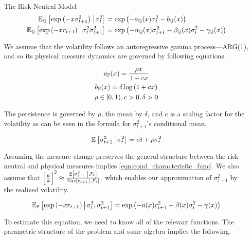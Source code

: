 \documentclass[11pt, letterpaper, twoside, final]{article}
\begin{document}
\begin{defn}{The Risk-Neutral Model}
\begin{align}
    \mathbb{E}_{\mathbb{Q}}\left[\exp\left(-x  \sigma^2_{t+1}\right) \,\middle\vert\, \sigma^2_t\right] &= \exp\left(-a_{\mathbb{Q}}(x)
    \sigma_t^2 - b_{\mathbb{Q}}(x)\right) \\
    \mathbb{E}_{\mathbb{Q}}\left[\exp\left(-x  r_{t+1} \right)\,\middle\vert\, \sigma^2_t \sigma^2_{t+1}\right] &=
    \exp\left(-\alpha_{\mathbb{Q}}(x) \sigma^2_{t+1} - \beta_{\mathbb{Q}}(x) \sigma^2_t - \gamma_{\mathbb{Q}}(x)\right)
\end{align}
\end{defn}


We assume that the volatility follows an autoregressive gamma process---ARG(1), and so its physical measure
dynamics are governed by following equations.

\begin{gather}
    a_{\mathbb{P}}(x) = \frac{\rho x}{1 + c x}  \\
    b_{\mathbb{P}}(x) = \delta \log \left(1 + c x\right) \\
    \rho \in [0, 1), c > 0, \delta > 0 
\end{gather}

The persistence is governed by $\rho$, the mean by $\delta$, and $c$ is a scaling factor for the volatility as can
be seen in the formula for $\sigma^2_{t+1}$'s conditional mean.

\begin{equation}
    \mathbb{E}\left[\sigma^2_{t+1} \,\middle\vert\, \sigma^2_t\right] = c \delta + \rho \sigma^2_t
\end{equation}

Assuming the measure change preserves the general structure between the risk-neutral and physical measures implies
\cref{eqn:cond_characterisitc_func}.
We also assume that $\left[ \frac{\psi}{\phi} \right]^2 \approx \frac{\mathbb{E} \left[\sigma^2_{t+1} \,\middle\vert\,
\mathcal{F}_t\right]}{\mathbb{V}ar\left[r_{t+1} \,\middle\vert\, \mathcal{F}_t\right]}$, which enables our approximation of $\sigma^2_{t+1}$ by the
realized volatility.

\begin{equation}
    \label{eqn:cond_characterisitc_func}
    \mathbb{E}_{\mathbb{P}}\left[\exp\left(- x r_{t+1}\right) \,\middle\vert\, \sigma_t^2, \sigma^2_{t+1}\right] = \exp\left(- a(x)
    r^2_{t+1} - \beta(x) \sigma^2_t - \gamma(x) \right) 
\end{equation}

To estimate this equation, we need to know all of the relevant functions.
The parametric structure of the problem and some algebra implies the following.
\end{document}
